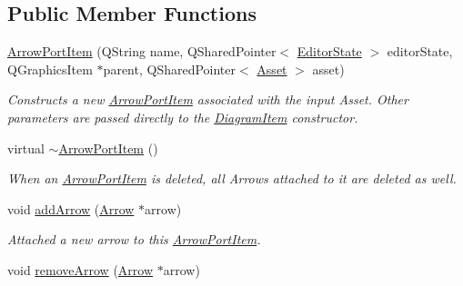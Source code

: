 \subsection*{Public Member Functions}
\begin{DoxyCompactItemize}
\item 
\hypertarget{class_arrow_port_item_ac0a2c8f2c3fa2a5d6017747330943bdb}{\hyperlink{class_arrow_port_item_ac0a2c8f2c3fa2a5d6017747330943bdb}{Arrow\-Port\-Item} (Q\-String name, Q\-Shared\-Pointer$<$ \hyperlink{class_editor_state}{Editor\-State} $>$ editor\-State, Q\-Graphics\-Item $\ast$parent, Q\-Shared\-Pointer$<$ \hyperlink{class_picto_1_1_asset}{Asset} $>$ asset)}\label{class_arrow_port_item_ac0a2c8f2c3fa2a5d6017747330943bdb}

\begin{DoxyCompactList}\small\item\em Constructs a new \hyperlink{class_arrow_port_item}{Arrow\-Port\-Item} associated with the input Asset. Other parameters are passed directly to the \hyperlink{class_diagram_item}{Diagram\-Item} constructor. \end{DoxyCompactList}\item 
\hypertarget{class_arrow_port_item_a8deb582f5aa71c6b386d4c97dc107e23}{virtual \hyperlink{class_arrow_port_item_a8deb582f5aa71c6b386d4c97dc107e23}{$\sim$\-Arrow\-Port\-Item} ()}\label{class_arrow_port_item_a8deb582f5aa71c6b386d4c97dc107e23}

\begin{DoxyCompactList}\small\item\em When an \hyperlink{class_arrow_port_item}{Arrow\-Port\-Item} is deleted, all Arrows attached to it are deleted as well. \end{DoxyCompactList}\item 
\hypertarget{class_arrow_port_item_a9b53ca8eaa1421172ee66c5db887ed6c}{void \hyperlink{class_arrow_port_item_a9b53ca8eaa1421172ee66c5db887ed6c}{add\-Arrow} (\hyperlink{class_arrow}{Arrow} $\ast$arrow)}\label{class_arrow_port_item_a9b53ca8eaa1421172ee66c5db887ed6c}

\begin{DoxyCompactList}\small\item\em Attached a new arrow to this \hyperlink{class_arrow_port_item}{Arrow\-Port\-Item}. \end{DoxyCompactList}\item 
\hypertarget{class_arrow_port_item_af64ba878fa69b8d7d16c2c035654d853}{void \hyperlink{class_arrow_port_item_af64ba878fa69b8d7d16c2c035654d853}{remove\-Arrow} (\hyperlink{class_arrow}{Arrow} $\ast$arrow)}\label{class_arrow_port_item_af64ba878fa69b8d7d16c2c035654d853}


\end{DoxyCompactItemize}

